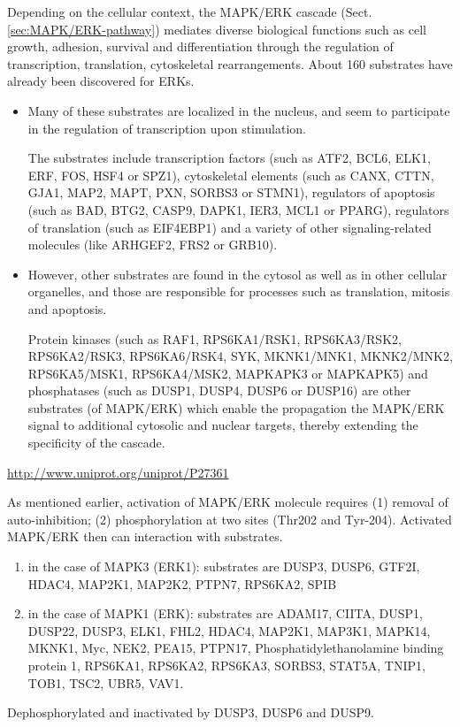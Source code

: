 Depending on the cellular context, the MAPK/ERK cascade
(Sect.\ref{sec:MAPK/ERK-pathway}) mediates diverse biological functions such as
cell growth, adhesion, survival and differentiation through the regulation of
transcription, translation, cytoskeletal rearrangements. About 160 substrates
have already been discovered for ERKs.
\begin{itemize}
  \item Many of these substrates are localized in the nucleus, and seem to participate
in the regulation of transcription upon stimulation.

The substrates include transcription factors (such as ATF2, BCL6, ELK1, ERF,
FOS, HSF4 or SPZ1), cytoskeletal elements (such as CANX, CTTN, GJA1, MAP2, MAPT,
PXN, SORBS3 or STMN1), regulators of apoptosis (such as BAD, BTG2, CASP9, DAPK1,
IER3, MCL1 or PPARG), regulators of translation (such as EIF4EBP1) and a variety
of other signaling-related molecules (like ARHGEF2, FRS2 or GRB10).
  
  \item  However, other substrates are found in the cytosol as well as in other
  cellular organelles, and those are responsible for processes such as
  translation, mitosis and apoptosis. 

Protein kinases (such as RAF1, RPS6KA1/RSK1, RPS6KA3/RSK2, RPS6KA2/RSK3,
RPS6KA6/RSK4, SYK, MKNK1/MNK1, MKNK2/MNK2, RPS6KA5/MSK1, RPS6KA4/MSK2, MAPKAPK3
or MAPKAPK5) and phosphatases (such as DUSP1, DUSP4, DUSP6 or DUSP16) are other
substrates (of MAPK/ERK) which enable the propagation the MAPK/ERK signal to
additional cytosolic and nuclear targets, thereby extending the specificity of
the cascade.
\end{itemize}
\url{http://www.uniprot.org/uniprot/P27361}

As mentioned earlier, activation of MAPK/ERK molecule requires (1) removal of
auto-inhibition; (2) phosphorylation at two sites (Thr202 and Tyr-204).
Activated MAPK/ERK then can interaction with substrates.
\begin{enumerate}
  \item in the case of MAPK3 (ERK1): substrates are DUSP3, DUSP6, GTF2I, 
  HDAC4, MAP2K1, MAP2K2, PTPN7, RPS6KA2, SPIB
  
  \item in the case of MAPK1 (ERK): substrates are ADAM17, CIITA, DUSP1, DUSP22,
  DUSP3, ELK1, FHL2, HDAC4, MAP2K1, MAP3K1, MAPK14, MKNK1, Myc, NEK2, PEA15,
  PTPN17, Phosphatidylethanolamine binding protein 1, RPS6KA1, RPS6KA2, RPS6KA3,
  SORBS3, STAT5A, TNIP1, TOB1, TSC2, UBR5, VAV1.
\end{enumerate}
Dephosphorylated and inactivated by DUSP3, DUSP6 and DUSP9.


